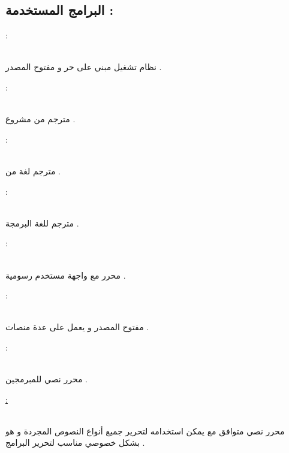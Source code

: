 \documentclass[11pt,a4paper]{report}
\begin{document}
\begin{otherlanguage}{arabic}
\chapter{البرامج المستخدمة :}
\begin{otherlanguage}{arabic}
\begin{center}
\begin{flushleft}
\underline{} :
\end{flushleft}
\\
نظام تشغيل مبني على \textit{} حر و مفتوح المصدر .
\\
\begin{flushleft}
\underline{} :
\end{flushleft}
\\
مترجم \textit{} من مشروع \textit{} .
\\
\begin{flushleft}
\underline{} :
\end{flushleft}
\\
مترجم لغة \textit{} من \textit{} .
\\
\begin{flushleft}
\underline{} :
\end{flushleft}
\\
مترجم للغة البرمجة \textit{} .
\\
\begin{flushleft}
\underline{} :
\end{flushleft}
\\
محرر \textit{} مع واجهة مستخدم رسومية .
\\
\begin{flushleft}
\underline{} :
\end{flushleft}
\\
\textit{} مفتوح المصدر و يعمل على عدة منصات .
\\
\begin{flushleft}
\underline{} :
\end{flushleft}
\\
محرر نصي للمبرمجين .
\\
\begin{flushleft}
\underline{\textbf{} :}
\end{flushleft}
\\
محرر نصي متوافق مع \textit{} يمكن استخدامه لتحرير جميع أنواع النصوص المجردة و هو بشكل خصوصي مناسب لتحرير البرامج .

\end{center}
\end{otherlanguage}
\end{otherlanguage}
\end{document}
